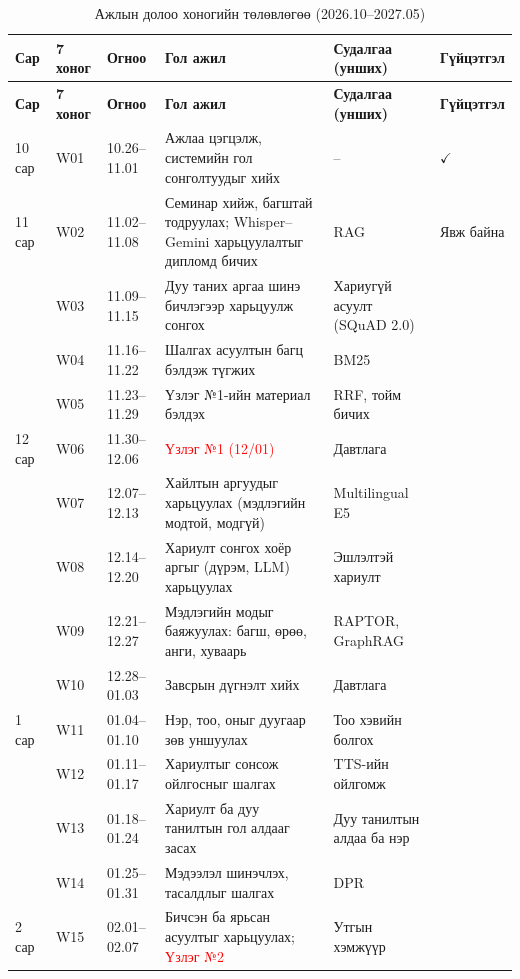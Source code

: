 {\small
\setlength{\tabcolsep}{4pt}
\renewcommand{\arraystretch}{1.12}
\begin{longtable}{|p{1.0cm}|p{0.9cm}|p{1.85cm}|p{6.0cm}|p{3.0cm}|p{1.3cm}|}
\caption{Ажлын долоо хоногийн төлөвлөгөө (2026.10--2027.05)}\label{tab:plan}\\
\hline
\textbf{Сар} & \textbf{7 хоног} & \textbf{Огноо} & \textbf{Гол ажил} & \textbf{Судалгаа (унших)} & \textbf{Гүйцэт\-гэл} \\
\hline
\endfirsthead
\hline
\textbf{Сар} & \textbf{7 хоног} & \textbf{Огноо} & \textbf{Гол ажил} & \textbf{Судалгаа (унших)} & \textbf{Гүйцэт\-гэл} \\
\hline
\endhead
10 сар & W01 & 10.26--11.01 & Ажлаа цэгцэлж, системийн гол сонголтуудыг хийх & -- & $\checkmark$ \\
\hline
11 сар & W02 & 11.02--11.08 & Семинар хийж, багштай тодруулах; Whisper--Gemini харьцуулалтыг дипломд бичих & RAG & Явж байна \\
 & W03 & 11.09--11.15 & Дуу таних аргаа шинэ бичлэгээр харьцуулж сонгох & Хариугүй асуулт (SQuAD 2.0) & \\
 & W04 & 11.16--11.22 & Шалгах асуултын багц бэлдэж түгжих & BM25 & \\
 & W05 & 11.23--11.29 & Үзлэг №1-ийн материал бэлдэх & RRF, тойм бичих & \\
\hline
12 сар & W06 & 11.30--12.06 & \textcolor{red}{Үзлэг №1 (12/01)} & Давтлага & \\
 & W07 & 12.07--12.13 & Хайлтын аргуудыг харьцуулах (мэдлэгийн модтой, модгүй) & Multilingual E5 & \\
 & W08 & 12.14--12.20 & Хариулт сонгох хоёр аргыг (дүрэм, LLM) харьцуулах & Эшлэлтэй хариулт & \\
 & W09 & 12.21--12.27 & Мэдлэгийн модыг баяжуулах: багш, өрөө, анги, хуваарь & RAPTOR, GraphRAG & \\
 & W10 & 12.28--01.03 & Завсрын дүгнэлт хийх & Давтлага & \\
\hline
1 сар & W11 & 01.04--01.10 & Нэр, тоо, оныг дуугаар зөв уншуулах & Тоо хэвийн болгох & \\
 & W12 & 01.11--01.17 & Хариултыг сонсож ойлгосныг шалгах & TTS-ийн ойлгомж & \\
 & W13 & 01.18--01.24 & Хариулт ба дуу танилтын гол алдааг засах & Дуу танилтын алдаа ба нэр & \\
 & W14 & 01.25--01.31 & Мэдээлэл шинэчлэх, тасалдлыг шалгах & DPR & \\
\hline
2 сар & W15 & 02.01--02.07 & Бичсэн ба ярьсан асуултыг харьцуулах; \textcolor{red}{Үзлэг №2} & Утгын хэмжүүр & \\

\end{longtable}}
